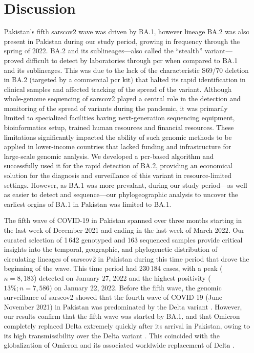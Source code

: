 \section{Discussion}\label{sec-disc}
Pakistan's fifth \gls{sarscov2} wave was driven by BA.1, however lineage BA.2 was also present in Pakistan during our study period, growing in frequency through the spring of 2022.
BA.2 and its sublineages---also called the ``stealth'' variant---proved difficult to detect by laboratories through \gls{pcr} when compared to BA.1 and its sublineages.
This was due to the lack of the characteristic S69/70 deletion in BA.2 (targeted by a commercial \gls{pcr} kit) that halted its rapid identification in clinical samples and affected tracking of the spread of the variant.
Although whole-genome sequencing of \gls{sarscov2} played a central role in the detection and monitoring of the spread of variants during the pandemic, it was primarily limited to specialized facilities having next-generation sequencing equipment, bioinformatics setup, trained human resources and financial resources. These limitations significantly impacted the ability of such genomic methods to be applied in lower-income countries that lacked funding and infrastructure for large-scale genomic analysis.
We developed a \gls{pcr}-based algorithm and successfully used it for the rapid detection of BA.2, providing an economical solution for the diagnosis and surveillance of this variant in resource-limited settings.
However, as BA.1 was more prevalant, during our study period---as well as easier to detect and sequence---our phylogeographic analysis to uncover the earliest orgins of BA.1 in Pakistan was limited to BA.1.

The fifth wave of COVID-19 in Pakistan spanned over three months starting in the last week of December 2021 and ending in the last week of March 2022.
Our curated selection of 1\,642 genotyped and 163 sequenced samples provide critical insights into the temporal, geographic, and phylogenetic distribution of circulating lineages of \gls{sarscov2} in Pakistan during this time period that drove the beginning of the wave.
This time period had 230\,184 cases, with a peak ($n=8,183$) detected on January 27, 2022 and the highest positivity ($13\%; n=7,586$) on January 22, 2022.
Before the fifth wave, the genomic surveillance of \gls{sarscov2} showed that the fourth wave of COVID-19 (June--November 2021) in Pakistan was predominated by the Delta variant \citep{ourworldindataPK}.
However, our results confirm that the fifth wave was started by BA.1, and that Omicron completely replaced Delta extremely quickly after its arrival in Pakistan, owing to its high transmissibility over the Delta variant \citep{dhawan2022Omicron,francisco2022emergence}.
This coincided with the globalization of Omicron and its associated worldwide replacement of Delta \citep{mohapatra2022twin, mohapatra2022Omicron}.


